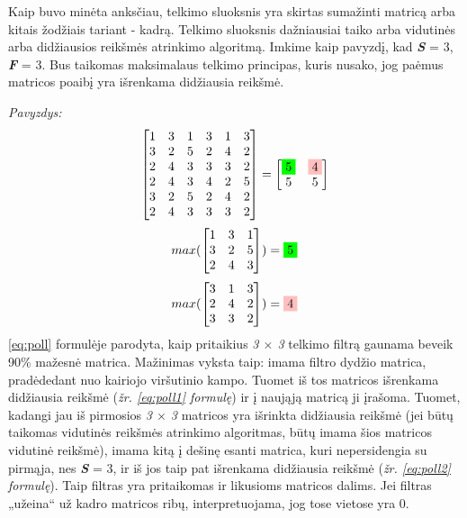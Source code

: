 \documentclass{VUMIFInfKursinis}
\begin{document}
Kaip buvo minėta anksčiau, telkimo sluoksnis yra skirtas sumažinti matricą arba kitais žodžiais tariant - kadrą. Telkimo sluoksnis dažniausiai taiko arba vidutinės arba didžiausios reikšmės atrinkimo algoritmą. Imkime kaip pavyzdį, kad \textbf{\textit{S}} = 3, \textbf{\textit{F}} = 3. Bus taikomas maksimalaus telkimo principas, kuris nusako, jog paėmus matricos poaibį yra išrenkama didžiausia reikšmė.

\textit{Pavyzdys:}
\begin{equation}\label{eq:poll}
	\begin{bmatrix}
	1 & 3 & 1 & 3 & 1 & 3 \\
	3 & 2 & 5 & 2 & 4 & 2 \\
	2 & 4 & 3 & 3 & 3 & 2 \\
	2 & 4 & 3 & 4 & 2 & 5 \\
	3 & 2 & 5 & 2 & 4 & 2 \\
	2 & 4 & 3 & 3 & 3 & 2
	\end{bmatrix}
	= 
	\begin{bmatrix}
	\colorbox{green}{5} & \colorbox{pink}{4} \\
	5 & 5 
	\end{bmatrix}
\end{equation}
\begin{equation}\label{eq:poll1}
	max(
	\begin{bmatrix}
	1 & 3 & 1 \\
	3 & 2 & 5 \\
	2 & 4 & 3
	\end{bmatrix}
	) = \colorbox{green}{5}
\end{equation}
\begin{equation}\label{eq:poll2}
	max(
	\begin{bmatrix}
	3 & 1 & 3 \\
	2 & 4 & 2 \\
	3 & 3 & 2
	\end{bmatrix}
	) = \colorbox{pink}{4}
\end{equation}
\ref{eq:poll} formulėje parodyta, kaip pritaikius \textit{3 $\times$ 3} telkimo filtrą gaunama beveik 90\% mažesnė matrica. Mažinimas vyksta taip: imama filtro dydžio matrica, pradėdedant nuo kairiojo viršutinio kampo. Tuomet iš tos matricos išrenkama didžiausia reikšmė (\textit{žr. \ref{eq:poll1} formulę}) ir į naująją matricą ji įrašoma. Tuomet, kadangi jau iš pirmosios \textit{3 $\times$ 3} matricos yra išrinkta didžiausia reikšmė (jei būtų taikomas vidutinės reikšmės atrinkimo algoritmas, būtų imama šios matricos vidutinė reikšmė), imama kitą į dešinę esanti matrica, kuri nepersidengia su pirmąja, nes \textbf{\textit{S}} = 3,  ir iš jos taip pat išrenkama didžiausia reikšmė (\textit{žr. \ref{eq:poll2} formulę}). Taip filtras yra pritaikomas ir likusioms matricos dalims. Jei filtras „užeina“ už kadro matricos ribų, interpretuojama, jog tose vietose yra 0.
\end{document}
